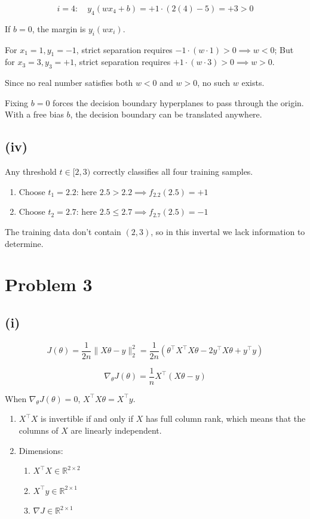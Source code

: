 \documentclass[11pt]{article}
\begin{document}
$$
i=4: \quad y_4(w x_4 + b) = +1 \cdot (2(4) - 5) = +3 > 0
$$

If $b=0$, the margin is $y_i (w x_i)$.

For $x_1 = 1, y_1 = -1$, strict separation requires $-1 \cdot (w \cdot 1) > 0 \implies w < 0$; But for $x_3 = 3, y_3 = +1$, strict separation requires $+1 \cdot (w \cdot 3) > 0 \implies w > 0$.

Since no real number satisfies both $w < 0$ and $w > 0$, no such $w$ exists.

Fixing $b=0$ forces the decision boundary hyperplanes to pass through the origin. With a free bias $b$, the decision boundary can be translated anywhere.

\subsection*{(iv)}
Any threshold $t \in [2, 3)$ correctly classifies all four training samples.

\begin{enumerate}
    \item Choose $t_1 = 2.2$: here $2.5 > 2.2 \implies f_{2.2}(2.5) = +1$
    \item Choose $t_2 = 2.7$: here $2.5 \le 2.7 \implies f_{2.7}(2.5) = -1$
\end{enumerate}

The training data don't contain $(2, 3)$, so in this invertal we lack information to determine.

\newpage

\section*{Problem 3}

\subsection*{(i)}

$$
J(\theta) = \frac{1}{2n} \|X\theta - y\|_2^2 = \frac{1}{2n} \left( \theta^\top X^\top X \theta - 2 y^\top X \theta + y^\top y \right)
$$

$$
\nabla_\theta J(\theta) = \frac{1}{n} X^\top (X\theta - y)
$$

When $\nabla_\theta J(\theta) = 0$, $X^\top X \theta = X^\top y$.
\begin{enumerate}
    \item $X^\top X$ is invertible if and only if $X$ has full column rank, which means that the columns of $X$ are linearly independent.
    \item Dimensions:
    \begin{enumerate}
        \item $X^\top X \in \mathbb{R}^{2 \times 2}$
        \item $X^\top y \in \mathbb{R}^{2 \times 1}$
        \item $\nabla J \in \mathbb{R}^{2 \times 1}$
    \end{enumerate}
\end{enumerate}
\end{document}
